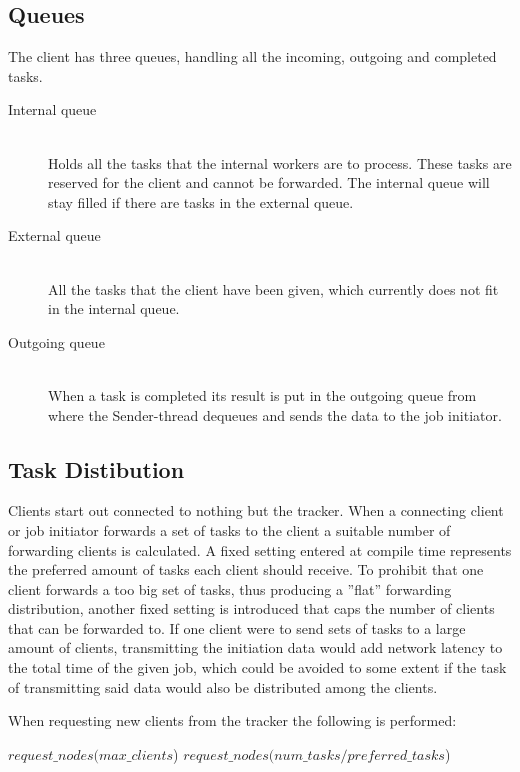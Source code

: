 \subsection{Queues}
The client has three queues, handling all the incoming, outgoing and completed
tasks.
\begin{description}
	\item[Internal queue] \hfill \\
	Holds all the tasks that the internal workers are to process. These tasks
	are reserved for the client and cannot be forwarded. The internal queue will
	stay filled if there are tasks in the external queue.
	\item[External queue] \hfill \\
	All the tasks that the client have been given, which currently does not 
	fit in the internal queue.
	\item[Outgoing queue] \hfill \\
	When a task is completed its result is put in the outgoing queue from where
	the Sender-thread dequeues and sends the data to the job initiator.
\end{description}

\subsection{Task Distibution}
Clients start out connected to nothing but the tracker. When a connecting client
or job initiator forwards a set of tasks to the client a suitable number of
forwarding clients is calculated. A fixed setting entered at compile time represents
the preferred amount of tasks each client should receive. To prohibit that one
client forwards a too big set of tasks, thus producing a ''flat'' forwarding
distribution, another fixed setting is introduced that caps the number of
clients that can be forwarded to. If one client were to send sets of tasks to a
large amount of clients, transmitting the initiation data would add network
latency to the total time of the given job, which could be avoided to some
extent if the task of transmitting said data would also be distributed among the
clients.

When requesting new clients from the tracker
the following is performed: \\

\begin{samepage}
\begin{algorithmic}
\STATE {}
	\STATE $request\_nodes(max\_clients$)
\ELSE
	\STATE $request\_nodes(num\_tasks/preferred\_tasks$)
\ENDIF
\end{algorithmic}
\end{samepage}

